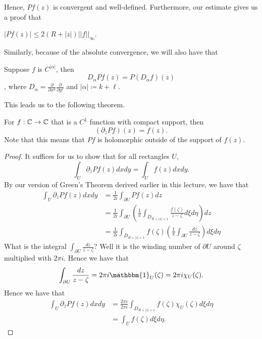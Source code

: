 \documentclass{article}
\begin{document}
{Hence, $Pf(z)$ is convergent and well-defined. Furthermore, our estimate gives us a proof that
\begin{proposition}
    $|Pf(z)| \leq 2 (R + |z|) ||f||_\infty$. 
\end{proposition}

Similarly, because of the absolute convergence, we will also have that
\begin{proposition}
    Suppose $f$ is $C^{|\alpha|}$, then
    $$D_\alpha Pf(z) = P(D_\alpha f)(z)$$,
    where $D_\alpha = \frac{\partial}{\partial x^k} \frac{\partial}{\partial y^\ell}$ and $|\alpha| \coloneqq k + \ell$.
\end{proposition}

This leads us to the following theorem.
\begin{theorem}
    For $f: \mathbb{C} \to \mathbb{C}$ that is a $C^1$ function with compact support, then
    \[(\partial_{\overline{z}} Pf)(z) = f(z).\]
    Note that this means that $Pf$ is holomorphic outside of the support of $f(z)$.
\end{theorem}

\begin{proof}
    It suffices for us to show that for all rectangles $U$, 
    \[\int_{U} \partial_{\overline{z}} Pf(z) dx dy = \int_{U} f(z) dx dy.\]
    By our version of Green's Theorem derived earlier in this lecture, we have that
    \begin{align*}
        \int_U \partial_{\overline{z}} Pf(z) dx dy &= \frac{1}{2i} \int_{\partial U} Pf(z) dz\\
        &= \frac{1}{2i} \int_{\partial U} \left(\frac{1}{\pi}\int_{D_{R + |z| + 1}} \frac{f(\zeta)}{z - \zeta} d\xi d\eta \right) dz\\
        &= \frac{1}{2i} \int_{D_{R + |z| + 1}} f(\zeta) \left(\frac{1}{\pi}\int_{\partial U} \frac{dz}{z - \zeta}\right) d\xi d\eta \tag*{Fubini-Tonelli Theorem because of absolute convergence}
    \end{align*}
    What is the integral $\int_{\partial U} \frac{dz}{z - \zeta}$? Well it is the winding number of $\partial U$ around $\zeta$ multiplied with $2 \pi i$. Hence we have that
    \[\int_{\partial U} \frac{dz}{z - \zeta} = 2\pi i \mathbbm{1}_{U}(\zeta) = 2\pi i \chi_U(\zeta).\]
    Hence we have that
        \begin{align*}
        \int_U \partial_{\overline{z}} Pf(z) dx dy &= \frac{2\pi i}{2\pi i} \int_{D_{R + |z| + 1}} f(\zeta) \chi_U(\zeta) d\xi d\eta\\
        &= \int_{U} f(\zeta) d\xi d\eta.
    \end{align*}
\end{proof}

}
\end{document}
